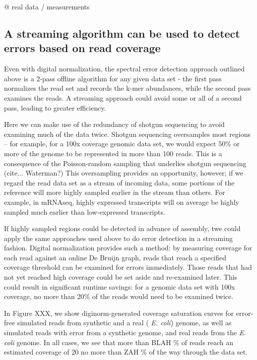 @ real data / measurements

\subsection{A streaming algorithm can be used to detect errors based on read coverage}

Even with digital normalization, the spectral error detection approach
outlined above is a 2-pass offline algorithm for any given data set -
the first pass normalizes the read set and records the k-mer
abundances, while the second pass examines the reads.  A streaming
approach could avoid some or all of a second pass, leading to
greater efficiency.

Here we can make use of the redundancy of shotgun sequencing to avoid
examining much of the data twice. Shotgun
sequencing oversamples most regions -- for example, for a 100x
coverage genomic data set, we would expect 50\% or more of the genome
to be represented in more than 100 reads.  This is a consequence of
the Poisson-random sampling that underlies shotgun sequencing
(cite... Waterman?)  This oversampling provides an opportunity,
however; if we regard the read data set as a stream of incoming data,
some portions of the reference will more highly sampled earlier in the
stream than others.  For example, in mRNAseq, highly expressed
transcripts will on average be highly sampled much earlier than
low-expressed transcripts.

If highly sampled regions could be detected in advance of assembly,
twe could apply the same approaches used above to do error detection
in a streaming fashion.  Digital normalization provides such a method:
by measuring coverage for each read against an online De Bruijn graph,
reads that reach a specified coverage threshold can be examined for
errors immediately.  Those reads that had not yet reached high
coverage could be set aside and re-examined later.  This could result
in significant runtime savings: for a genomic data set with 100x
coverage, no more than 20\% of the reads would need to be examined
twice.

In Figure XXX, we show diginorm-generated coverage saturation curves
for error-free simulated reads from synthetic and a real ({\em
  E. coli}) genome, as well as simulated reads with error from a
synthetic genome, and real reads from the {\em E. coli} genome.  In
all cases, we see that more than BLAH \% of reads reach an estimated
coverage of 20 no more than ZAH \% of the way through the data set.

